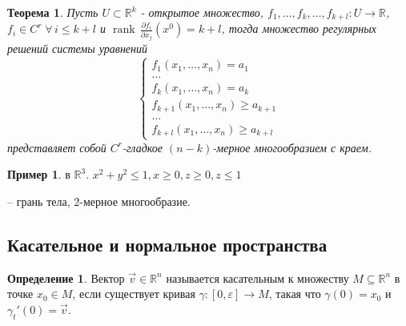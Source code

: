 \documentclass[a5paper]{article}
\newcounter{through}
\theoremstyle{plain}
\newtheorem{theorem}[through]{Теорема}
\theoremstyle{definition}
\newtheorem{definition}[through]{Определение}
\newtheorem{example}[through]{Пример}
\numberwithin{through}{section}
\numberwithin{equation}{section}
\DeclareMathOperator{\rank}{rank}
\begin{document}
\begin{theorem}
	Пусть $U \subset \mathbb{R}^k$ - открытое множество, $f_1, \ldots, f_{k}, \ldots ,f_{k+l} : 
	U \to \mathbb{R}$, $f_i \in C^r \; \forall \, i \leq k + l$ и $\rank \, \frac{\partial f_i}{\partial x_j} (x^0) = k + l$,  тогда множество регулярных решений системы уравнений
	\begin{equation*}
	\begin{cases}
	f_1(x_1, \ldots, x_n) = a_1
	\\
	\ldots
	\\
	f_k(x_1, \ldots, x_n) = a_k
	\\
	f_{k+1}(x_1, \ldots, x_n) \geq a_{k+1}
	\\
	\ldots
	\\
	f_{k+l}(x_1, \ldots, x_n) \geq a_{k+l}
	\end{cases}
	\end{equation*}
	представляет собой $C^r$-гладкое $(n-k)$-мерное многообразием с краем.
\end{theorem}

\begin{example}
	в $\mathbb{R}^3$. $x^2+y^2\leq 1, x\geq 0, z\geq 0, z\leq 1$
	
	\begin{center}
		

		
	\end{center}
-- грань тела, $2$-мерное многообразие.

\end{example}


\subsection{Касательное и нормальное пространства}

\begin{definition}
	Вектор $\vec{v} \in \mathbb{R}^n$ называется касательным к множеству 
	$M \subseteq \mathbb{R}^n$ в точке $x_0 \in M$, если существует кривая
	$\gamma : [0, \varepsilon] \to M$, такая что $\gamma(0) = x_0$ и $\gamma_t'(0) = \vec{v}$.
\end{definition}
\end{document}
